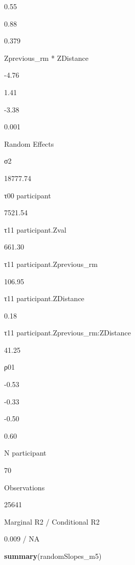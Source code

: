 \documentclass[
]{article}
\newenvironment{Shaded}{\begin{snugshade}}{\end{snugshade}}
\newcommand{\KeywordTok}[1]{\textcolor[rgb]{0.13,0.29,0.53}{\textbf{#1}}}
\newcommand{\NormalTok}[1]{#1}
\begin{document}
0.55

0.88

0.379

Zprevious\_rm * ZDistance

-4.76

1.41

-3.38

0.001

Random Effects

σ2

18777.74

τ00 participant

7521.54

τ11 participant.Zval

661.30

τ11 participant.Zprevious\_rm

106.95

τ11 participant.ZDistance

0.18

τ11 participant.Zprevious\_rm:ZDistance

41.25

ρ01

-0.53

-0.33

-0.50

0.60

N participant

70

Observations

25641

Marginal R2 / Conditional R2

0.009 / NA

\begin{Shaded}
\begin{Highlighting}[]
\KeywordTok{summary}\NormalTok{(randomSlopes_m5)}
\end{Highlighting}
\end{Shaded}
\end{document}
